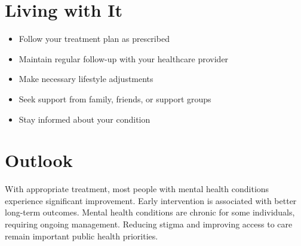 \section{Living with It}
\begin{itemize}[noitemsep]
  \item Follow your treatment plan as prescribed
  \item Maintain regular follow-up with your healthcare provider
  \item Make necessary lifestyle adjustments
  \item Seek support from family, friends, or support groups
  \item Stay informed about your condition
\end{itemize}
\section{Outlook}
With appropriate treatment, most people with mental health conditions experience significant improvement. Early intervention is associated with better long-term outcomes. Mental health conditions are chronic for some individuals, requiring ongoing management. Reducing stigma and improving access to care remain important public health priorities.
